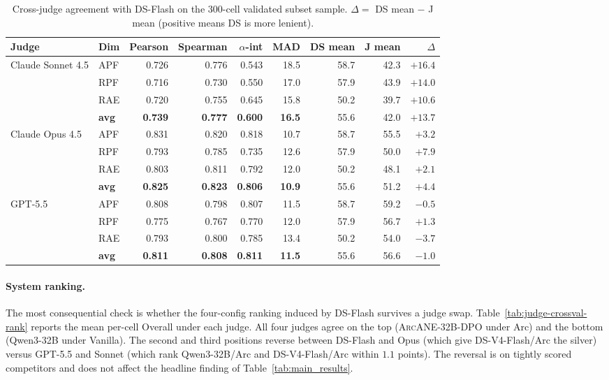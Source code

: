 \documentclass{llmxive}
\providecommand{\ours}{\textsc{ArcANE}}
\providecommand{\arraystretch}{0.95}
\begin{document}
\begin{table}[t!]
\centering
\small
\setlength{\tabcolsep}{5pt}
\renewcommand{\arraystretch}{0.95}
\begin{tabular}{llrrrrrrr}
\toprule
Judge & Dim & Pearson & Spearman & $\alpha$-int & MAD & DS mean & J mean & $\Delta$ \\
\midrule
\multirow{4}{*}{Claude Sonnet 4.5} & APF & 0.726 & 0.776 & 0.543 & 18.5 & 58.7 & 42.3 & $+16.4$ \\
                                   & RPF & 0.716 & 0.730 & 0.550 & 17.0 & 57.9 & 43.9 & $+14.0$ \\
                                   & RAE & 0.720 & 0.755 & 0.645 & 15.8 & 50.2 & 39.7 & $+10.6$ \\
                                   & \textbf{avg} & \textbf{0.739} & \textbf{0.777} & \textbf{0.600} & \textbf{16.5} & 55.6 & 42.0 & $\mathbf{+13.7}$ \\
\midrule
\multirow{4}{*}{Claude Opus 4.5}   & APF & 0.831 & 0.820 & 0.818 & 10.7 & 58.7 & 55.5 & $+3.2$ \\
                                   & RPF & 0.793 & 0.785 & 0.735 & 12.6 & 57.9 & 50.0 & $+7.9$ \\
                                   & RAE & 0.803 & 0.811 & 0.792 & 12.0 & 50.2 & 48.1 & $+2.1$ \\
                                   & \textbf{avg} & \textbf{0.825} & \textbf{0.823} & \textbf{0.806} & \textbf{10.9} & 55.6 & 51.2 & $\mathbf{+4.4}$ \\
\midrule
\multirow{4}{*}{GPT-5.5}           & APF & 0.808 & 0.798 & 0.807 & 11.5 & 58.7 & 59.2 & $-0.5$ \\
                                   & RPF & 0.775 & 0.767 & 0.770 & 12.0 & 57.9 & 56.7 & $+1.3$ \\
                                   & RAE & 0.793 & 0.800 & 0.785 & 13.4 & 50.2 & 54.0 & $-3.7$ \\
                                   & \textbf{avg} & \textbf{0.811} & \textbf{0.808} & \textbf{0.811} & \textbf{11.5} & 55.6 & 56.6 & $\mathbf{-1.0}$ \\
\bottomrule
\end{tabular}
\caption{Cross-judge agreement with DS-Flash on the $300$-cell validated subset sample. $\Delta = $ DS mean $-$ J mean (positive means DS is more lenient).}
\label{tab:judge-crossval-overall}
\end{table}

\paragraph{System ranking.} The most consequential check is whether the four-config ranking induced by DS-Flash survives a judge swap. Table~\ref{tab:judge-crossval-rank} reports the mean per-cell Overall under each judge. All four judges agree on the top (\ours{}-32B-DPO under Arc) and the bottom (Qwen3-32B under Vanilla). The second and third positions reverse between DS-Flash and Opus (which give DS-V4-Flash/Arc the silver) versus GPT-5.5 and Sonnet (which rank Qwen3-32B/Arc and DS-V4-Flash/Arc within $1.1$ points). The reversal is on tightly scored competitors and does not affect the headline finding of Table~\ref{tab:main_results}.
\end{document}
